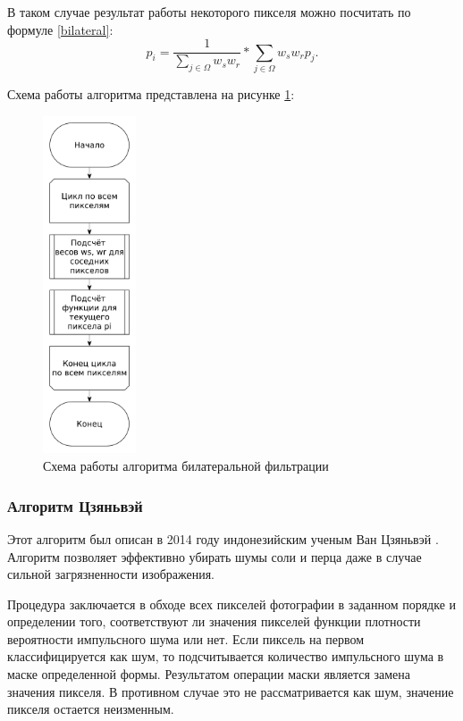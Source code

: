 В таком случае результат работы некоторого пикселя можно посчитать по формуле \eqref{bilateral}:
\begin{equation}
	\label{bilateral}
	p_i = \frac{1}{\sum_{j \in \Omega}^{} w_{s}w_{r}} * \sum_{j \in \Omega}^{} w_{s}w_{r}p_j.
\end{equation}

Схема работы алгоритма представлена на рисунке \ref{fig::bilateral}:
\FloatBarrier
\begin{figure}[h]	
	\begin{center}
		\includegraphics[height=10cm]{inc/pdf/bilateral.pdf}
	\end{center}
	\captionsetup{justification=centering}
	\caption{Схема работы алгоритма билатеральной фильтрации}
	\label{fig::bilateral}
\end{figure}
\FloatBarrier

\subsubsection{Алгоритм Цзяньвэй}
Этот алгоритм был описан в 2014 году индонезийским ученым Ван Цзяньвэй \cite{color_image}.
Алгоритм позволяет эффективно убирать шумы соли и перца даже в случае сильной загрязненности изображения.

Процедура заключается в обходе всех пикселей фотографии в заданном порядке и определении того, соответствуют ли значения пикселей функции плотности вероятности импульсного шума или нет. 
Если пиксель на первом классифицируется как шум, то подсчитывается количество импульсного шума в маске определенной формы.
Результатом операции маски является замена значения пикселя.
В противном случае это не рассматривается как шум, значение пикселя остается неизменным.

